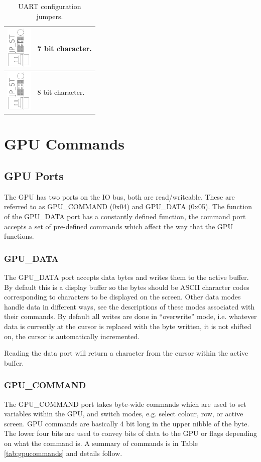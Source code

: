 \documentclass[a4paper,10pt]{book}
\begin{document}
\begin{table}[h]
\begin{tabular}{| l | p{8cm} |}
  \hline
  \includegraphics[height=2cm]{jpst_7b.pdf}&7 bit character.\\
  \hline
  \includegraphics[height=2cm]{jpst_8b.pdf}&8 bit character.\\
  \hline
 \end{tabular}
 \caption{UART configuration jumpers.}
 \label{tab:jpst}
\end{table}

\chapter{GPU Commands}
\section{GPU Ports}
The GPU has two ports on the IO bus, both are read/writeable.  These are
referred to as GPU\_COMMAND (0x04) and GPU\_DATA (0x05).  The function of the
GPU\_DATA port has a constantly defined function, the command port accepts a set
of pre-defined commands which affect the way that the GPU functions.

\subsection{GPU\_DATA}
The GPU\_DATA port accepts data bytes and writes them to the active buffer.  By
default this is a display buffer so the bytes should be ASCII character codes 
corresponding to characters to be displayed on the screen.  Other data modes 
handle data in different ways, see the descriptions of these modes associated
with their commands.  By default all writes are done in ``overwrite'' mode, i.e.
whatever data is currently at the cursor is replaced with the byte written, it
is not shifted on, the cursor is automatically incremented.

Reading the data port will return a character from the cursor within the active
buffer.

\subsection{GPU\_COMMAND}
The GPU\_COMMAND port takes byte-wide commands which are used to set variables
within the GPU, and switch modes, e.g. select colour, row, or active screen.
GPU commands are basically 4 bit long in the upper nibble of the byte.  The
lower four bits are used to convey bits of data to the GPU or flags depending on
what the command is.  A summary of commands is in Table \ref{tab:gpucommands}
and details follow.
\end{document}
